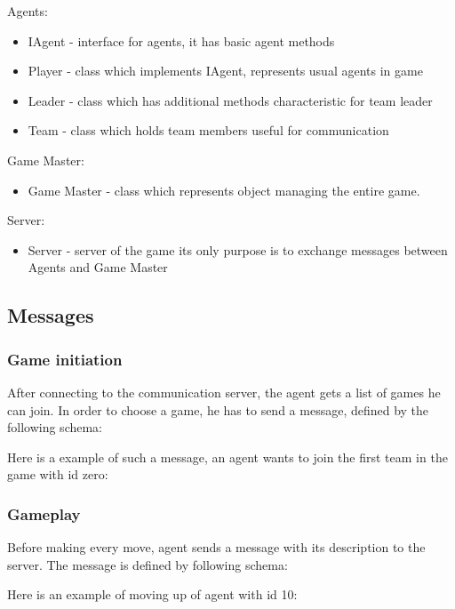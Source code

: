 \documentclass[11pt,a4paper]{article}
\begin{document}
\cdot Agents:
\begin{itemize}
\item IAgent - interface for agents, it has basic agent methods
\item Player - class which implements IAgent, represents usual agents in game
\item Leader - class which has additional methods characteristic for team leader
\item Team - class which holds team members useful for communication
\end{itemize}

\cdot Game Master:
\begin{itemize}
\item Game Master - class which represents object managing the entire game.
\end{itemize}

\cdot Server:
\begin{itemize}
\item Server - server of the game its only purpose is to exchange messages between Agents and Game Master
\end{itemize}

\subsection{Messages}

\subsubsection{Game initiation}

After connecting to the communication server, the agent gets a list of games he can join. In order to choose a game, he has to send a message, defined by the following schema:

Here is a example of such a message, an agent wants to join the first team in the game with id zero:


\subsubsection{Gameplay}
Before making every move, agent sends a message with its description to the server. The message is defined by following schema:


Here is an example of moving up of agent with id 10:

\end{document}
